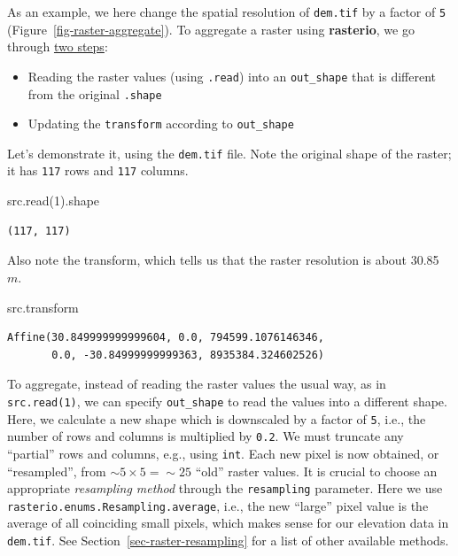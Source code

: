 \documentclass[
  letterpaper,
]{krantz}
\newenvironment{Shaded}{\begin{snugshade}}{\end{snugshade}}
\newcommand{\DecValTok}[1]{\textcolor[rgb]{0.68,0.00,0.00}{#1}}
\newcommand{\NormalTok}[1]{\textcolor[rgb]{0.00,0.23,0.31}{#1}}
\providecommand{\tightlist}{%
  \setlength{\itemsep}{0pt}\setlength{\parskip}{0pt}}\usepackage{longtable,booktabs,array}
\begin{document}
As an example, we here change the spatial resolution of \texttt{dem.tif}
by a factor of \texttt{5} (Figure~\ref{fig-raster-aggregate}). To
aggregate a raster using \textbf{rasterio}, we go through
\href{https://rasterio.readthedocs.io/en/stable/topics/resampling.html}{two
steps}:

\begin{itemize}
\tightlist
\item
  Reading the raster values (using \texttt{.read}) into an
  \texttt{out\_shape} that is different from the original
  \texttt{.shape}
\item
  Updating the \texttt{transform} according to \texttt{out\_shape}
\end{itemize}

Let's demonstrate it, using the \texttt{dem.tif} file. Note the original
shape of the raster; it has \texttt{117} rows and \texttt{117} columns.

\begin{Shaded}
\begin{Highlighting}[]
\NormalTok{src.read(}\DecValTok{1}\NormalTok{).shape}
\end{Highlighting}
\end{Shaded}

\begin{verbatim}
(117, 117)
\end{verbatim}

Also note the transform, which tells us that the raster resolution is
about 30.85 \(m\).

\begin{Shaded}
\begin{Highlighting}[]
\NormalTok{src.transform}
\end{Highlighting}
\end{Shaded}

\begin{verbatim}
Affine(30.849999999999604, 0.0, 794599.1076146346,
       0.0, -30.84999999999363, 8935384.324602526)
\end{verbatim}

To aggregate, instead of reading the raster values the usual way, as in
\texttt{src.read(1)}, we can specify \texttt{out\_shape} to read the
values into a different shape. Here, we calculate a new shape which is
downscaled by a factor of \texttt{5}, i.e., the number of rows and
columns is multiplied by \texttt{0.2}. We must truncate any ``partial''
rows and columns, e.g., using \texttt{int}. Each new pixel is now
obtained, or ``resampled'', from \(\sim 5 \times 5 = \sim 25\) ``old''
raster values. It is crucial to choose an appropriate \emph{resampling
method} through the \texttt{resampling} parameter. Here we use
\texttt{rasterio.enums.Resampling.average}, i.e., the new ``large''
pixel value is the average of all coinciding small pixels, which makes
sense for our elevation data in \texttt{dem.tif}. See
Section~\ref{sec-raster-resampling} for a list of other available
methods.
\end{document}
